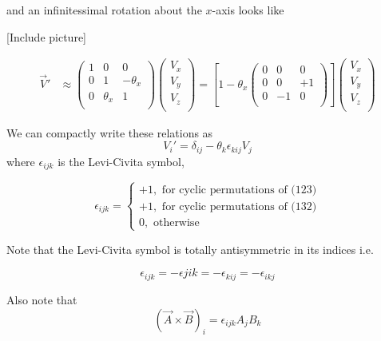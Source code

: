 \documentclass[11pt]{article}
\begin{document}
and an infinitessimal rotation about the $x$-axis looks like 


\vskip 0.5cm
[Include picture]
\vskip 0.5cm

\begin{align*}
  \vec{V}' &\approx \begin{pmatrix}
    1 & 0 & 0 \\
    0 & 1 & -\theta_x \\
    0 & \theta_x & 1\\
  \end{pmatrix} 
  \begin{pmatrix}
      V_x \\
      V_y \\
      V_z \\
  \end{pmatrix} = \left[ 1 - \theta_x \begin{pmatrix}
    0 & 0 & 0 \\
    0 & 0 & +1 \\
    0 & -1 & 0 \\
  \end{pmatrix}  \right]   \begin{pmatrix}
    V_x \\
    V_y \\
    V_z \\
\end{pmatrix}
\end{align*}

\vskip 0.5cm
\begin{bluebox}
  We can compactly write these relations as 
  \[ V_i ' =  \delta_{ij} - \theta_k \epsilon_{kij} V_j \]
  where $\epsilon_{ijk}$ is the Levi-Civita symbol,

  \[ 
  \epsilon_{ijk} = \begin{cases}
    +1, \text{ for cyclic permutations of (123)} \\
    +1, \text{ for cyclic permutations of (132)} \\
    0, \text{ otherwise}
  \end{cases}
  \]
\end{bluebox}

\begin{redbox}
  Note that the Levi-Civita symbol is totally antisymmetric in its indices i.e.

  \[ \epsilon_{ijk} = -\epsilon{jik} = -\epsilon_{kij} = -\epsilon_{ikj} \]
\end{redbox}

\begin{redbox}
  Also note that 
  \[ (\vec{A} \times \vec{B})_{i} = \epsilon_{ijk} A_{j} B_{k} \]
\end{redbox}
\end{document}
